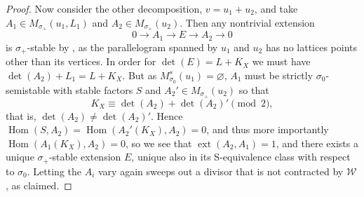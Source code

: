 \documentclass[leqno,11pt]{amsart}
\def\ext{\mathop{\mathrm{ext}}\nolimits}
\def\Hom{\mathop{\mathrm{Hom}}\nolimits}
\theoremstyle{definition}
\def\WW{\ensuremath{\mathcal W}}
\begin{document}
\begin{proof}
Now consider the other decomposition, $v=u_1+u_2$, and take $A_1\in M_{\sigma_+}(u_1,L_1)$ and $A_2\in M_{\sigma_+}(u_2)$.  Then any nontrivial extension $$0\to A_1\to E\to A_2\to 0$$ is $\sigma_+$-stable by \cite[Lemma 9.3]{BM14b}, as the parallelogram spanned by $u_1$ and $u_2$ has no lattices points other than its vertices.  In order for $\det(E)=L+K_X$ we must have $\det(A_2)+L_1=L+K_X$.  But as $M_{\sigma_0}^s(u_1)=\varnothing$, $A_1$ must be strictly $\sigma_0$-semistable with stable factors $S$ and $A_2'\in M_{\sigma_+}(u_2)$ so that $$K_X\equiv\det(A_2)+\det(A_2)'\pmod 2,$$ that is, $\det(A_2)\neq\det(A_2)'$.  Hence $\Hom(S,A_2)=\Hom(A_2'(K_X),A_2)=0$, and thus more importantly $\Hom(A_1(K_X),A_2)=0$, so we see that $\ext(A_2,A_1)=1$, and there exists a unique $\sigma_+$-stable extension $E$, unique also in its S-equivalence class with respect to $\sigma_0$.  Letting the $A_i$ vary again sweeps out a divisor that is not contracted by $\WW$, as claimed.
\end{proof}
\end{document}
